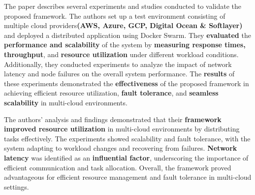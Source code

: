 The paper describes several experiments and studies conducted to validate the proposed framework. The authors set up a test environment consisting of multiple cloud providers\textbf{(AWS, Azure, GCP, Digital Ocean \& Softlayer)} and deployed a distributed application using Docker Swarm. They \textbf{evaluated} the \textbf{performance and scalability} of the system by \textbf{measuring response times, throughput}, and \textbf{resource utilization} under different workload conditions. Additionally, they conducted experiments to analyze the impact of network latency and node failures on the overall system performance. The \textbf{results} of these experiments demonstrated the \textbf{effectiveness} of the proposed framework in achieving efficient resource utilization, \textbf{fault tolerance}, and \textbf{seamless scalability} in multi-cloud environments.
\newline

The authors' analysis and findings demonstrated that their \textbf{framework improved resource utilization} in multi-cloud environments by distributing tasks effectively. The experiments showed scalability and fault tolerance, with the system adapting to workload changes and recovering from failures. \textbf{Network latency} was identified as an \textbf{influential factor}, underscoring the importance of efficient communication and task allocation. Overall, the framework proved advantageous for efficient resource management and fault tolerance in multi-cloud settings.
\newline

